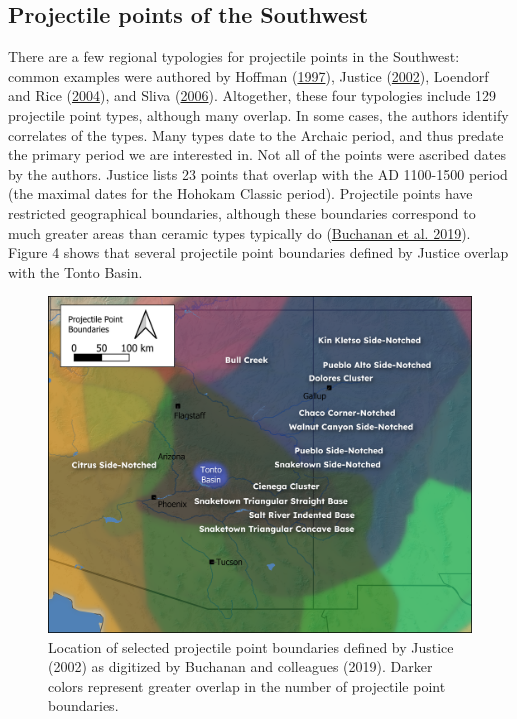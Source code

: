 \documentclass{article}
\begin{document}
\hypertarget{projectile-points-of-the-southwest}{%
\subsection{Projectile points of the
Southwest}\label{projectile-points-of-the-southwest}}

There are a few regional typologies for projectile points in the
Southwest: common examples were authored by Hoffman
(\protect\hyperlink{ref-Hoffman1997-hb}{1997}), Justice
(\protect\hyperlink{ref-Justice2002-cf}{2002}), Loendorf and Rice
(\protect\hyperlink{ref-Loendorf2004-tp}{2004}), and Sliva
(\protect\hyperlink{ref-Sliva2006-nq}{2006}). Altogether, these four
typologies include 129 projectile point types, although many overlap. In
some cases, the authors identify correlates of the types. Many types
date to the Archaic period, and thus predate the primary period we are
interested in. Not all of the points were ascribed dates by the authors.
Justice lists 23 points that overlap with the AD 1100-1500 period (the
maximal dates for the Hohokam Classic period). Projectile points have
restricted geographical boundaries, although these boundaries correspond
to much greater areas than ceramic types typically do
(\protect\hyperlink{ref-Buchanan2019-vn}{Buchanan et al. 2019}). Figure
4 shows that several projectile point boundaries defined by Justice
overlap with the Tonto Basin.

\begin{figure}
\includegraphics[width=1\linewidth]{figures/ProjPointBoundaries} \caption{Location of selected projectile point boundaries defined by Justice (2002) as digitized by Buchanan and colleagues (2019). Darker colors represent greater overlap in the number of projectile point boundaries.}\label{fig:ProjectilePointBoundaries}
\end{figure}
\end{document}
